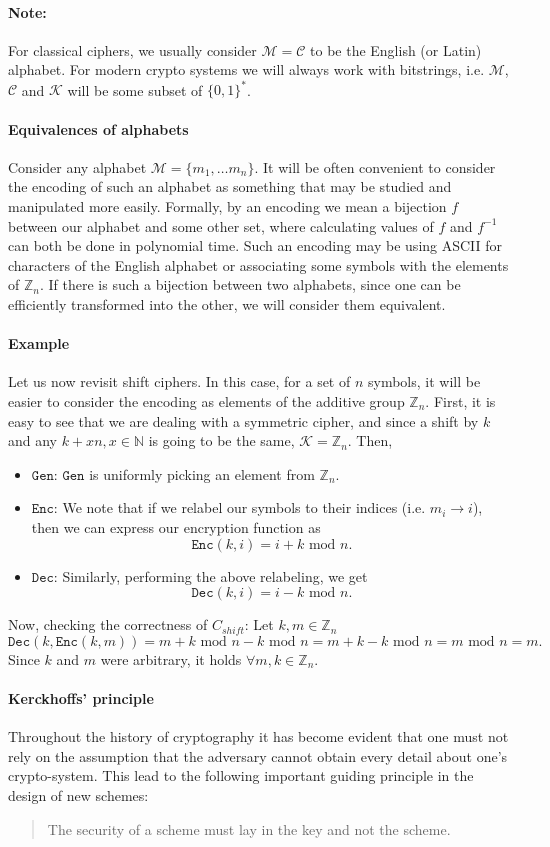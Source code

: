 \documentclass{article}
\theoremstyle{definition}
\theoremstyle{example}
\newcommand{\Enc}{\texttt{Enc}}
\newcommand{\Dec}{\texttt{Dec}}
\newcommand{\Gen}{\texttt{Gen}}
\newcommand{\M}{\mathcal{M}}
\renewcommand{\C}{\mathcal{C}}
\newcommand{\K}{\mathcal{K}}
\newcommand{\Int}{\mathbb{Z}}
\renewcommand{\mod}{\,\,\text{mod}\,\,}
\begin{document}
\paragraph{Note:} For classical ciphers, we usually consider $\M = \C$ to be the
English (or Latin) alphabet. For modern crypto systems we will always work with
bitstrings, i.e. $\M$, $\C$ and $\K$ will be some subset of $\{0, 1\}^*$.
\paragraph{Equivalences of alphabets}
Consider any alphabet $\M = \{m_1, \hdots m_n\}$. It will be 
often convenient to consider the encoding of such an alphabet as something that
may be studied and manipulated more easily. Formally, by an encoding we mean a
bijection $f$ between our alphabet and some other set, where calculating values
of $f$ and $f^{-1}$ can both be done in polynomial time. Such an encoding may
be using ASCII for characters of the English alphabet or associating some
symbols with the elements of $\Int_n$. If there is such a bijection between
two alphabets, since one can be efficiently transformed into the other, we will
consider them equivalent.

\paragraph{Example}
Let us now revisit shift ciphers. In this case, for a set of $n$ symbols, it
will be easier to consider the encoding as elements of the additive group
$\Int_n$. First, it is easy to see that we are dealing with a
symmetric cipher, and since a shift by $k$ and any $k + xn, x \in \mathbb{N}$ is
going to be the same, $\K = \Int_n$. Then,
\begin{itemize}
\item $\Gen$: $\Gen$ is uniformly picking an element from $\Int_n$.
\item $\Enc$: We note that if we relabel our symbols to their
  indices (i.e. $m_i \to i$), then we can express our encryption function as
  \[
    \Enc(k, i) = i + k \mod n.
  \]
\item $\Dec$: Similarly, performing the above relabeling, we get
  \[
    \Dec(k, i) = i - k \mod n.
  \]
\end{itemize}
Now, checking the correctness of $C_{shift}$: Let $k, m \in \Int_n$
\[
  \Dec(k, \Enc(k, m)) = m + k \mod n - k \mod n = m + k - k \mod n = m \mod n = m.
\]
Since $k$ and $m$ were arbitrary, it holds $\forall m, k \in \Int_n$.
\paragraph{Kerckhoffs' principle}
Throughout the history of cryptography it has become evident that one must not
rely on the assumption that the adversary cannot obtain every detail about one's
crypto-system. This lead to the following important guiding principle in the
design of new schemes:
\begin{quotation}
The security of a scheme must lay in the key and not the scheme.
\end{quotation}
\end{document}
